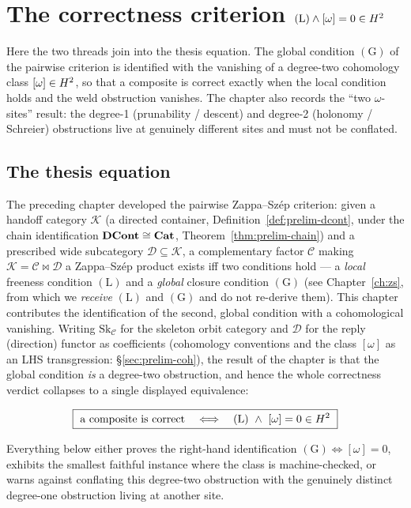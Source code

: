 \chapter{The correctness criterion $(\mathrm{L})\wedge[\omega]=0\in H^2$}
\label{ch:crit}
Here the two threads join into the thesis equation. The global condition
$(\mathrm{G})$ of the pairwise criterion is identified with the vanishing of a
degree-two cohomology class $[\omega]\in H^2$, so that a composite is correct
exactly when the local condition holds and the weld obstruction vanishes. The
chapter also records the ``two $\omega$-sites'' result: the degree-1
(prunability / descent) and degree-2 (holonomy / Schreier) obstructions live at
genuinely different sites and must not be conflated.

\section{The thesis equation}
\label{sec:crit-thesis}

The preceding chapter developed the pairwise Zappa--Sz\'ep criterion: given a
handoff category $\mathcal{K}$ (a directed container, Definition~\ref{def:prelim-dcont},
under the chain identification $\mathbf{DCont}\cong\mathbf{Cat}$, Theorem~\ref{thm:prelim-chain})
and a prescribed wide subcategory $\mathcal{D}\subseteq\mathcal{K}$, a complementary
factor $\mathcal{C}$ making $\mathcal{K}=\mathcal{C}\bowtie\mathcal{D}$ a Zappa--Sz\'ep
product exists iff two conditions hold --- a \emph{local} freeness condition
$(\mathrm{L})$ and a \emph{global} closure condition $(\mathrm{G})$ (see
Chapter~\ref{ch:zs}, from which we \emph{receive} $(\mathrm{L})$ and $(\mathrm{G})$
and do not re-derive them). This chapter contributes the identification of the
second, global condition with a cohomological vanishing. Writing $\mathrm{Sk}_{\mathcal{C}}$
for the skeleton orbit category and $\mathcal D$ for the reply (direction) functor as
coefficients (cohomology conventions and the class $[\omega]$ as an LHS
transgression: \S\ref{sec:prelim-coh}), the result of the chapter is that the
global condition \emph{is} a degree-two obstruction, and hence the whole
correctness verdict collapses to a single displayed equivalence:

\begin{equation}
\boxed{\ \text{a composite is correct}\quad\Longleftrightarrow\quad (\mathrm{L}) \ \wedge\ [\omega]=0\in \Hcoh\ }
\label{eq:crit-thesis}
\end{equation}

Everything below either proves the right-hand identification $(\mathrm{G})\Leftrightarrow[\omega]=0$,
exhibits the smallest faithful instance where the class is machine-checked, or
warns against conflating this degree-two obstruction with the genuinely distinct
degree-one obstruction living at another site.

